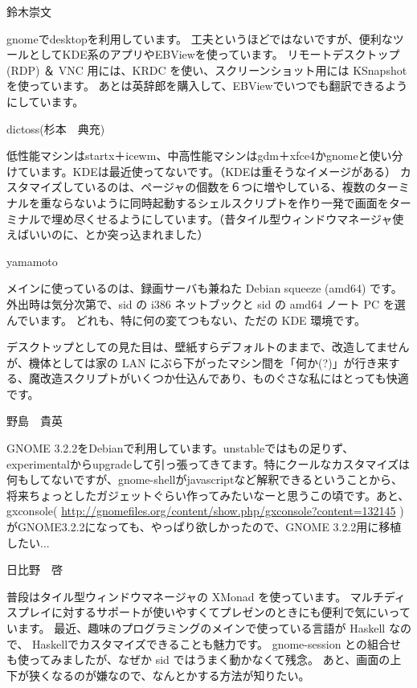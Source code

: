 \begin{prework}{ 鈴木崇文 }

gnomeでdesktopを利用しています。
工夫というほどではないですが、便利なツールとしてKDE系のアプリやEBViewを使っています。
リモートデスクトップ(RDP) ＆ VNC 用には、KRDC を使い、スクリーンショット用には KSnapshot を使っています。
あとは英辞郎を購入して、EBViewでいつでも翻訳できるようにしています。
\end{prework}

\begin{prework}{ dictoss(杉本　典充) }

低性能マシンはstartx＋icewm、中高性能マシンはgdm＋xfce4かgnomeと使い分けています。KDEは最近使ってないです。（KDEは重そうなイメージがある）
カスタマイズしているのは、ページャの個数を６つに増やしている、複数のターミナルを重ならないように同時起動するシェルスクリプトを作り一発で画面をターミナルで埋め尽くせるようにしています。（昔タイル型ウィンドウマネージャ使えばいいのに、とか突っ込まれました）
\end{prework}

\begin{prework}{ yamamoto }

メインに使っているのは、録画サーバも兼ねた Debian squeeze (amd64) です。
外出時は気分次第で、sid の i386 ネットブックと sid の amd64 ノート PC を選んでいます。
どれも、特に何の変てつもない、ただの KDE 環境です。

デスクトップとしての見た目は、壁紙すらデフォルトのままで、改造してませんが、機体としては家の LAN にぶら下がったマシン間を「何か(?)」が行き来する、魔改造スクリプトがいくつか仕込んであり、ものぐさな私にはとっても快適です。
\end{prework}

\begin{prework}{ 野島　貴英 }

GNOME 3.2.2をDebianで利用しています。unstableではもの足りず、experimentalからupgradeして引っ張ってきてます。特にクールなカスタマイズは何もしてないですが、gnome-shellがjavascriptなど解釈できるということから、将来ちょっとしたガジェットぐらい作ってみたいなーと思うこの頃です。あと、gxconsole( \url{http://gnomefiles.org/content/show.php/gxconsole?content=132145} )がGNOME3.2.2になっても、やっぱり欲しかったので、GNOME 3.2.2用に移植したい...
\end{prework}

\begin{prework}{ 日比野　啓 }

普段はタイル型ウィンドウマネージャの XMonad を使っています。
マルチディスプレイに対するサポートが使いやすくてプレゼンのときにも便利で気にいっています。
最近、趣味のプログラミングのメインで使っている言語が Haskell なので、
Haskellでカスタマイズできることも魅力です。
gnome-session との組合せも使ってみましたが、なぜか sid ではうまく動かなくて残念。
あと、画面の上下が狭くなるのが嫌なので、なんとかする方法が知りたい。

\end{prework}
